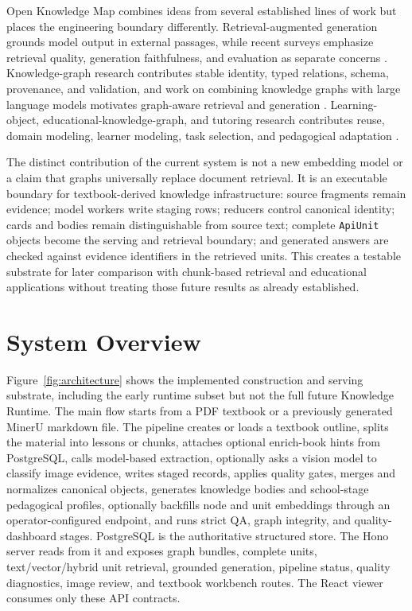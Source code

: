 \documentclass[11pt,letterpaper]{article}
\newcommand{\code}[1]{\nolinkurl{#1}}
\newcommand{\OKM}{Open Knowledge Map}
\begin{document}
\OKM{} combines ideas from several established lines of work but places the engineering boundary differently. Retrieval-augmented generation grounds model output in external passages, while recent surveys emphasize retrieval quality, generation faithfulness, and evaluation as separate concerns \cite{rag,gao-rag-survey}. Knowledge-graph research contributes stable identity, typed relations, schema, provenance, and validation, and work on combining knowledge graphs with large language models motivates graph-aware retrieval and generation \cite{hogan-kg,ji-kg-survey,pan-llm-kg}. Learning-object, educational-knowledge-graph, and tutoring research contributes reuse, domain modeling, learner modeling, task selection, and pedagogical adaptation \cite{wiley-learning-objects,qu-education-kg,vanlehn,koedinger-kli}.

The distinct contribution of the current system is not a new embedding model or a claim that graphs universally replace document retrieval. It is an executable boundary for textbook-derived knowledge infrastructure: source fragments remain evidence; model workers write staging rows; reducers control canonical identity; cards and bodies remain distinguishable from source text; complete \code{ApiUnit} objects become the serving and retrieval boundary; and generated answers are checked against evidence identifiers in the retrieved units. This creates a testable substrate for later comparison with chunk-based retrieval and educational applications without treating those future results as already established.

\section{System Overview}

Figure~\ref{fig:architecture} shows the implemented construction and serving substrate, including the early runtime subset but not the full future Knowledge Runtime. The main flow starts from a PDF textbook or a previously generated MinerU markdown file. The pipeline creates or loads a textbook outline, splits the material into lessons or chunks, attaches optional enrich-book hints from PostgreSQL, calls model-based extraction, optionally asks a vision model to classify image evidence, writes staged records, applies quality gates, merges and normalizes canonical objects, generates knowledge bodies and school-stage pedagogical profiles, optionally backfills node and unit embeddings through an operator-configured endpoint, and runs strict QA, graph integrity, and quality-dashboard stages. PostgreSQL is the authoritative structured store. The Hono server reads from it and exposes graph bundles, complete units, text/vector/hybrid unit retrieval, grounded generation, pipeline status, quality diagnostics, image review, and textbook workbench routes. The React viewer consumes only these API contracts.
\end{document}
